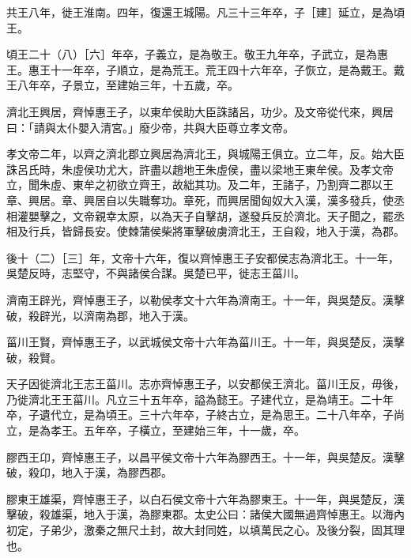 \begin{pinyinscope}
共王八年，徙王淮南。四年，復還王城陽。凡三十三年卒，子［建］延立，是為頃王。

頃王二十（八）［六］年卒，子義立，是為敬王。敬王九年卒，子武立，是為惠王。惠王十一年卒，子順立，是為荒王。荒王四十六年卒，子恢立，是為戴王。戴王八年卒，子景立，至建始三年，十五歲，卒。

濟北王興居，齊悼惠王子，以東牟侯助大臣誅諸呂，功少。及文帝從代來，興居曰：「請與太仆嬰入清宮。」廢少帝，共與大臣尊立孝文帝。

孝文帝二年，以齊之濟北郡立興居為濟北王，與城陽王俱立。立二年，反。始大臣誅呂氏時，朱虛侯功尤大，許盡以趙地王朱虛侯，盡以梁地王東牟侯。及孝文帝立，聞朱虛、東牟之初欲立齊王，故絀其功。及二年，王諸子，乃割齊二郡以王章、興居。章、興居自以失職奪功。章死，而興居聞匈奴大入漢，漢多發兵，使丞相灌嬰擊之，文帝親幸太原，以為天子自擊胡，遂發兵反於濟北。天子聞之，罷丞相及行兵，皆歸長安。使棘蒲侯柴將軍擊破虜濟北王，王自殺，地入于漢，為郡。

後十（二）［三］年，文帝十六年，復以齊悼惠王子安都侯志為濟北王。十一年，吳楚反時，志堅守，不與諸侯合謀。吳楚已平，徙志王菑川。

濟南王辟光，齊悼惠王子，以勒侯孝文十六年為濟南王。十一年，與吳楚反。漢擊破，殺辟光，以濟南為郡，地入于漢。

菑川王賢，齊悼惠王子，以武城侯文帝十六年為菑川王。十一年，與吳楚反，漢擊破，殺賢。

天子因徙濟北王志王菑川。志亦齊悼惠王子，以安都侯王濟北。菑川王反，毋後，乃徙濟北王王菑川。凡立三十五年卒，謚為懿王。子建代立，是為靖王。二十年卒，子遺代立，是為頃王。三十六年卒，子終古立，是為思王。二十八年卒，子尚立，是為孝王。五年卒，子橫立，至建始三年，十一歲，卒。

膠西王卬，齊悼惠王子，以昌平侯文帝十六年為膠西王。十一年，與吳楚反。漢擊破，殺卬，地入于漢，為膠西郡。

膠東王雄渠，齊悼惠王子，以白石侯文帝十六年為膠東王。十一年，與吳楚反，漢擊破，殺雄渠，地入于漢，為膠東郡。太史公曰：諸侯大國無過齊悼惠王。以海內初定，子弟少，激秦之無尺土封，故大封同姓，以填萬民之心。及後分裂，固其理也。


\end{pinyinscope}
